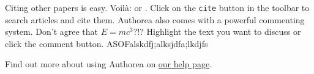 Citing other papers is easy. Voilà: \cite{2012} or \cite{Holstein_2009}. Click on the \verb|cite| button in the toolbar to search articles and cite them. Authorea also comes with a powerful commenting system. Don't agree that $E  =  mc^{3}$?!? Highlight the text you want to discuss or click the comment button. ASOFalskdfj;alksjdfa;lkdjfs

Find out more about using Authorea on \href{https://www.authorea.com/help}{our help page}.
  